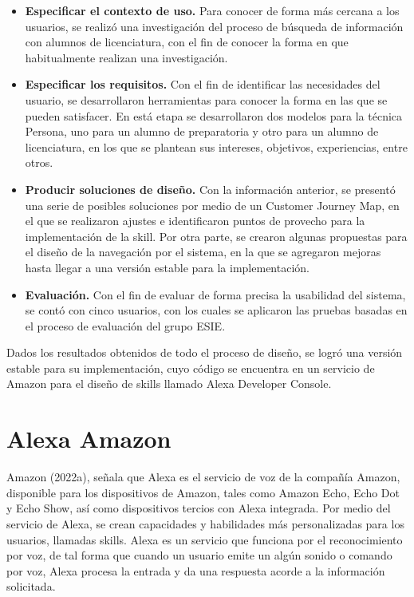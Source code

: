 \begin{itemize}
  \item \textbf{Especificar el contexto de uso.} Para conocer de forma más cercana a los usuarios, se realizó una investigación del proceso de búsqueda de información con alumnos de licenciatura, con el fin de conocer la forma en que habitualmente realizan una investigación.
  \item \textbf{Especificar los requisitos.} Con el fin de identificar las necesidades del usuario, se desarrollaron herramientas para conocer la forma en las que se pueden satisfacer. En está etapa se desarrollaron dos modelos para la técnica Persona, uno para un alumno de preparatoria y otro para un alumno de licenciatura, en los que se plantean sus intereses, objetivos, experiencias, entre otros.
  \item \textbf{Producir soluciones de diseño.} Con la información anterior, se presentó una serie de posibles soluciones por medio de un Customer Journey Map, en el que se realizaron ajustes e identificaron puntos de provecho para la implementación de la skill. Por otra parte, se crearon algunas propuestas para el diseño de la navegación por el sistema, en la que se agregaron mejoras hasta llegar a una versión estable para la implementación.  
  \item \textbf{Evaluación.} Con el fin de evaluar de forma precisa la usabilidad del sistema, se contó con cinco usuarios, con los cuales se aplicaron las pruebas basadas en el proceso de evaluación del grupo ESIE.
\end{itemize}

Dados los resultados obtenidos de todo el proceso de diseño, se logró una versión estable para su implementación, cuyo código se encuentra en un servicio de Amazon para el diseño de skills llamado Alexa Developer Console.


\section{Alexa Amazon}
\label{AlexacapIV}

Amazon (2022a), señala que Alexa es el servicio de voz de la compañía Amazon, disponible para los dispositivos de Amazon, tales como Amazon Echo, Echo Dot y Echo Show, así como dispositivos tercios con Alexa integrada. Por medio del servicio de Alexa, se crean capacidades y habilidades más personalizadas para los usuarios, llamadas skills. Alexa es un servicio que funciona por el reconocimiento por voz, de tal forma que cuando un usuario emite un algún sonido o comando por voz, Alexa procesa la entrada y da una respuesta acorde a la información solicitada.

